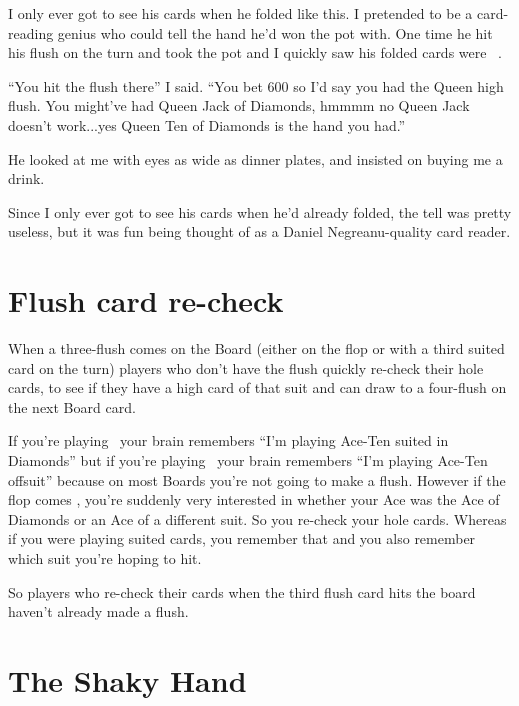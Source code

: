I only ever got to see his cards when he folded like this. I pretended
to be a card-reading genius who could tell the hand he'd won the pot
with. One time he hit his flush on the turn and took the pot and I
quickly saw his folded cards were \Qd\tend\ .

``You hit the flush there'' I said. ``You bet 600 so I'd
say you had the Queen high flush. You might've had Queen Jack of Diamonds,
hmmmm no Queen Jack doesn't work...yes Queen Ten of Diamonds is the hand
you had.''

He looked at me with eyes as wide as dinner plates, and insisted on buying
me a drink.

Since I only ever got to see his cards when he'd already folded, the tell
was pretty useless, but it was fun being thought of as a Daniel
Negreanu-quality card reader.


\section{Flush card re-check}

When a three-flush comes on the Board (either on the flop or with
a third suited card on the turn) players who don't have the flush
quickly re-check their hole cards, to see if they have a high card
of that suit and can draw to a four-flush on the next Board card.

If you're playing \Ad\tend\ your brain remembers ``I'm playing Ace-Ten
suited in Diamonds'' but if you're playing \Ad\tens\ your brain remembers
``I'm playing Ace-Ten offsuit'' because on most Boards you're not going to
make a flush. However if the flop comes \Kd\eigd\sevd, you're suddenly
very interested in whether your Ace was the Ace of Diamonds or an Ace of
a different suit. So you re-check your hole cards. Whereas if you were
playing suited cards, you remember that and you also remember which suit
you're hoping to hit.

So players who re-check their cards when the third flush card hits the
board haven't already made a flush.

\section{The Shaky Hand}

